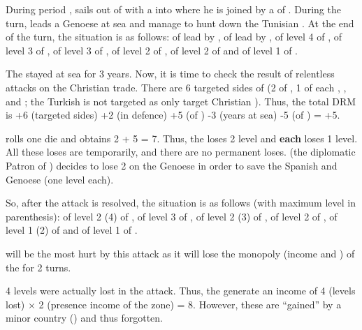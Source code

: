 \begin{exemple} During period ,
   sails out of \villeAlger with a
  \corsaire\faceplus into  where he is joined by a
  \corsaire\facemoins of \paysTunisie. During the turn,  leads a Genoese \FLEET\facemoins at sea and manage to hunt down the
  Tunisian \corsaire. At the end of the turn, the situation is as follows:
  \corsaire\faceplus of \paysAlgerie lead by ,
  \FLEET\facemoins of \paysGenes lead by ,
  \TradeFLEET\faceplus of level 4 of \FRA, \TradeFLEET\facemoins of level 3 of
  \paysHollande, \TradeFLEET\facemoins of level 3 of \paysGenes,
  \TradeFLEET\facemoins of level 2 of \SPA, \TradeFLEET\facemoins of level 2
  of \VEN and \TradeFLEET\facemoins of level 1 of \TUR.

  The \corsaire stayed at sea for 3 years. Now, it is time to check the result
  of  relentless attacks on the Christian trade. There are 6
  targeted sides of \TradeFLEET (2 of \FRA, 1 of each \paysHollande,
  \paysGenes, \HIS and \VEN; the Turkish \TradeFLEET is not targeted as
  \Barbaresques only target Christian \TradeFLEET). Thus, the total DRM is +6
  (targeted sides) +2 (\FLEET\facemoins in defence) +5 (\Man of ) -3 (years at sea) -5 (\Man of ) = +5.

  \TUR rolls one die and obtains 2 + 5 = 7. Thus, the \TradeFLEET\faceplus
  loses 2 level and \textbf{each} \TradeFLEET\facemoins loses 1 level. All
  these loses are temporarily, and there are no permanent loses. \HIS (the
  diplomatic Patron of \paysGenes) decides to lose 2 \NGD on the Genoese
  \FLEET in order to save the Spanish and Genoese \TradeFLEET (one level
  each).

  So, after the attack is resolved, the situation is as follows (with maximum
  level in parenthesis): \TradeFLEET\facemoins of level 2 (4) of \FRA,
  \TradeFLEET\facemoins of level 3 of \paysGenes, \TradeFLEET\facemoins of
  level 2 (3) of \paysHollande, \TradeFLEET\facemoins of level 2 of \HIS,
  \TradeFLEET\facemoins of level 1 (2) of \VEN and \TradeFLEET\facemoins of
  level 1 of \TUR.

  \FRA will be the most hurt by this attack as it will lose the monopoly
  (income and \VPs) of the \STZ for 2 turns.

  4 levels were actually lost in the attack. Thus, the \corsaire generate an
  income of 4 (levels lost) $\times$ 2 (presence income of the zone) =
  8\ducats. However, these are ``gained'' by a minor country (\paysAlgerie)
  and thus forgotten.


\end{exemple}
